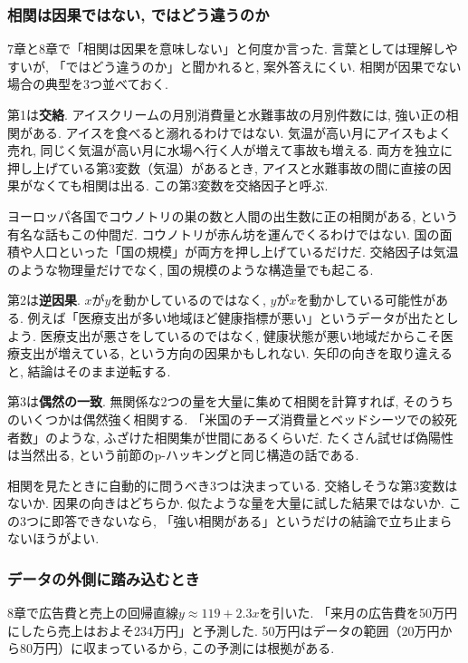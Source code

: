 \subsubsection*{相関は因果ではない, ではどう違うのか}

7章と8章で「相関は因果を意味しない」と何度か言った.
言葉としては理解しやすいが, 「ではどう違うのか」と聞かれると, 案外答えにくい.
相関が因果でない場合の典型を3つ並べておく.

第1は\textbf{交絡}.
アイスクリームの月別消費量と水難事故の月別件数には, 強い正の相関がある.
アイスを食べると溺れるわけではない. 気温が高い月にアイスもよく売れ, 同じく気温が高い月に水場へ行く人が増えて事故も増える.
両方を独立に押し上げている第3変数（気温）があるとき, アイスと水難事故の間に直接の因果がなくても相関は出る.
この第3変数を交絡因子と呼ぶ.

ヨーロッパ各国でコウノトリの巣の数と人間の出生数に正の相関がある, という有名な話もこの仲間だ.
コウノトリが赤ん坊を運んでくるわけではない. 国の面積や人口といった「国の規模」が両方を押し上げているだけだ.
交絡因子は気温のような物理量だけでなく, 国の規模のような構造量でも起こる.

第2は\textbf{逆因果}.
$x$が$y$を動かしているのではなく, $y$が$x$を動かしている可能性がある.
例えば「医療支出が多い地域ほど健康指標が悪い」というデータが出たとしよう.
医療支出が悪さをしているのではなく, 健康状態が悪い地域だからこそ医療支出が増えている, という方向の因果かもしれない.
矢印の向きを取り違えると, 結論はそのまま逆転する.

第3は\textbf{偶然の一致}.
無関係な2つの量を大量に集めて相関を計算すれば, そのうちのいくつかは偶然強く相関する.
「米国のチーズ消費量とベッドシーツでの絞死者数」のような, ふざけた相関集が世間にあるくらいだ.
たくさん試せば偽陽性は当然出る, という前節のp-ハッキングと同じ構造の話である.

相関を見たときに自動的に問うべき3つは決まっている.
交絡しそうな第3変数はないか.
因果の向きはどちらか.
似たような量を大量に試した結果ではないか.
この3つに即答できないなら, 「強い相関がある」というだけの結論で立ち止まらないほうがよい.

\subsubsection*{データの外側に踏み込むとき}

8章で広告費と売上の回帰直線$y \approx 119 + 2.3x$を引いた.
「来月の広告費を50万円にしたら売上はおよそ234万円」と予測した.
50万円はデータの範囲（20万円から80万円）に収まっているから, この予測には根拠がある.

